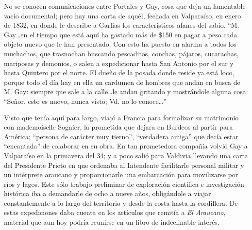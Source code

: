 \documentclass[10pt,twoside,openright]{memoir}
\begin{document}
No se conocen comunicaciones entre Portales y Gay, cosa que deja un
lamentable vacío documental; pero hay una carta de aquél, fechada en
Valparaíso, en enero de 1832, en donde le describe a Garfias los
característicos afanes del sabio. ``M. Gay\ldots en el tiempo que está aquí
ha gastado más de \$150 en pagar a peso cada objeto nuevo que le han
presentado. Con esto ha puesto en alarma a todos los muchachos, que
trasnochan buscando pescaditos, conchas, pájaros, cucarachas, mariposas
y demonios, o salen a expedicionar hasta San Antonio por el sur y hasta
Quintero por el norte. El dueño de la posada donde reside ya está loco,
porque todo el día hay en ella un cardumen de hombres que andan en busca
de M. Gay: siempre que sale a la calle\ldots le andan gritando y
mostrándole alguna cosa: ``Señor, esto es nuevo, nunca visto; Vd. no lo
conoce\ldots''

Visto que tenía aquí para largo, viajó a Francia para formalizar su
matrimonio con mademoiselle Sognier, la prometida que dejara en Burdeos
al partir para América; ``persona de carácter muy tierno'', ``verdadera
amiga'' que decía estar ``encantada'' de colaborar en su obra. En tan
prometedora compañía volvió Gay a Valparaíso en la primavera del 34; y a
poco salió para Valdivia llevando una carta del Presidente Prieto en que
ordenaba al Intendente facilitarle personal militar y un intérprete
araucano y proporcionarle una embarcación para movilizarse por ríos y
lagos. Este sólo trabajo preliminar de exploración científica e
investigación histórica iba a demandarle de ocho a nueve años,
obligándole a viajar constantemente a lo largo del territorio y desde la
costa hasta la cordillera. De estas expediciones daba cuenta en los
artículos que remitía a \emph{El Araucano}, material que aun hoy podría
reunirse en un libro de indeclinable interés.
\end{document}
